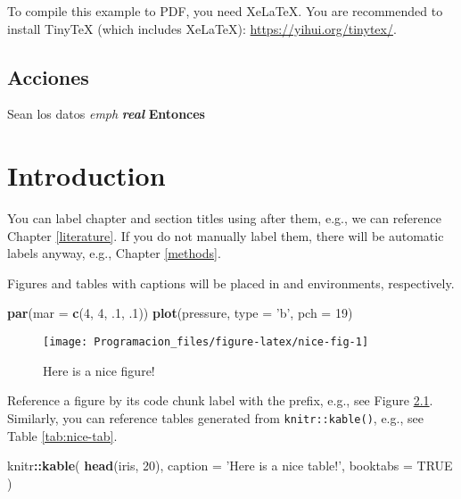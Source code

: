 \documentclass[12pt,]{report}
\newenvironment{Shaded}{\begin{snugshade}}{\end{snugshade}}
\newcommand{\DataTypeTok}[1]{\textcolor[rgb]{0.13,0.29,0.53}{#1}}
\newcommand{\DecValTok}[1]{\textcolor[rgb]{0.00,0.00,0.81}{#1}}
\newcommand{\FloatTok}[1]{\textcolor[rgb]{0.00,0.00,0.81}{#1}}
\newcommand{\KeywordTok}[1]{\textcolor[rgb]{0.13,0.29,0.53}{\textbf{#1}}}
\newcommand{\NormalTok}[1]{#1}
\newcommand{\OperatorTok}[1]{\textcolor[rgb]{0.81,0.36,0.00}{\textbf{#1}}}
\newcommand{\OtherTok}[1]{\textcolor[rgb]{0.56,0.35,0.01}{#1}}
\newcommand{\StringTok}[1]{\textcolor[rgb]{0.31,0.60,0.02}{#1}}
\begin{document}
To compile this example to PDF, you need XeLaTeX. You are recommended to install TinyTeX (which includes XeLaTeX): \url{https://yihui.org/tinytex/}.

\hypertarget{acciones}{%
\section{Acciones}\label{acciones}}

Sean los datos \emph{emph} \textbf{\emph{real}} \textbf{Entonces}

\hypertarget{intro}{%
\chapter{Introduction}\label{intro}}

You can label chapter and section titles using after them, e.g., we can reference Chapter \ref{literature}. If you do not manually label them, there will be automatic labels anyway, e.g., Chapter \ref{methods}.

Figures and tables with captions will be placed in and environments, respectively.

\begin{Shaded}
\begin{Highlighting}[]
\KeywordTok{par}\NormalTok{(}\DataTypeTok{mar =} \KeywordTok{c}\NormalTok{(}\DecValTok{4}\NormalTok{, }\DecValTok{4}\NormalTok{, }\FloatTok{.1}\NormalTok{, }\FloatTok{.1}\NormalTok{))}
\KeywordTok{plot}\NormalTok{(pressure, }\DataTypeTok{type =} \StringTok{'b'}\NormalTok{, }\DataTypeTok{pch =} \DecValTok{19}\NormalTok{)}
\end{Highlighting}
\end{Shaded}

\begin{figure}

{\centering \texttt{[image: Programacion\_files/figure-latex/nice-fig-1]} 

}

\caption{Here is a nice figure!}\label{fig:nice-fig}
\end{figure}

Reference a figure by its code chunk label with the prefix, e.g., see Figure \ref{fig:nice-fig}. Similarly, you can reference tables generated from \texttt{knitr::kable()}, e.g., see Table \ref{tab:nice-tab}.

\begin{Shaded}
\begin{Highlighting}[]
\NormalTok{knitr}\OperatorTok{::}\KeywordTok{kable}\NormalTok{(}
  \KeywordTok{head}\NormalTok{(iris, }\DecValTok{20}\NormalTok{), }\DataTypeTok{caption =} \StringTok{'Here is a nice table!'}\NormalTok{,}
  \DataTypeTok{booktabs =} \OtherTok{TRUE}
\NormalTok{)}
\end{Highlighting}
\end{Shaded}
\end{document}
